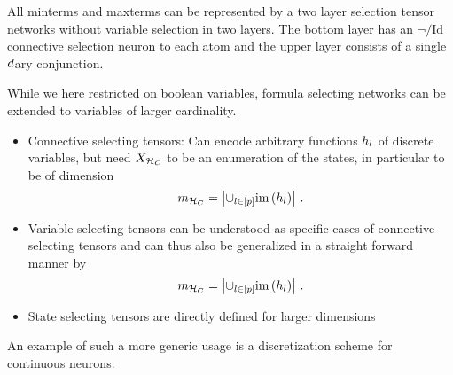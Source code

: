 \begin{remark}
	All minterms and maxterms can be represented by a two layer selection tensor networks without variable selection in two layers.
	The bottom layer has an $\lnot/\mathrm{Id}$ connective selection neuron to each atom and the upper layer consists of a single $d$ary conjunction.
\end{remark}





While we here restricted on boolean variables, formula selecting networks can be extended to variables of larger cardinality.
\begin{itemize}
	\item Connective selecting tensors: Can encode arbitrary functions $h_{l}$ of discrete variables, but need $X_{\mathcal{H}_{C}}$ to be an enumeration of the states, in particular to be of dimension
	\[ m_{\mathcal{H}_{C}} = \left| \cup_{l\in[p]} \mathrm{im}\left(h_{l}\right) \right| \, . \]
	\item Variable selecting tensors can be understood as specific cases of connective selecting tensors and can thus also be generalized in a straight forward manner by
	\[ m_{\mathcal{H}_{C}} = \left| \cup_{l\in[p]} \mathrm{im}\left(h_{l}\right) \right| \, .  \]
	\item State selecting tensors are directly defined for larger dimensions
\end{itemize}


An example of such a more generic usage is a discretization scheme for continuous neurons.

